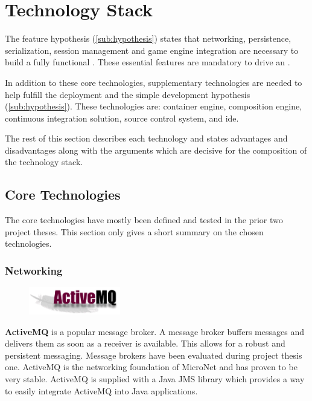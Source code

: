 \section{Technology Stack}

The feature hypothesis (\autoref{sub:hypothesis}) states that networking,
persistence, serialization, session management and game engine integration are
necessary to build a fully functional \og{}. These essential features are
mandatory to drive an \og{}.

In addition to these core technologies, supplementary technologies are needed to
help fulfill the deployment and the simple development hypothesis
(\autoref{sub:hypothesis}). These technologies are: container engine,
composition engine, continuous integration solution, source control system, and
\gls{ide}.

The rest of this section describes each technology and states advantages and
disadvantages along with the arguments which are decisive for the composition
of the technology stack.

\subsection{Core Technologies}

The core technologies have mostly been defined and tested in the prior two
project theses. This section only gives a short summary on the chosen
technologies.

\subsubsection{Networking}

\begin{figure}
	\vspace*{-0.2cm}
    \includegraphics[width=4cm]{images/dependencies/activemq}
\end{figure}

\textbf{ActiveMQ} is a popular message broker. A message broker buffers
messages and delivers them as soon as a receiver is available. This allows for a
robust and persistent messaging. Message brokers have been evaluated during
project thesis one. ActiveMQ is the networking foundation of MicroNet and
has proven to be very stable. ActiveMQ is supplied with a Java JMS library which
provides a way to easily integrate ActiveMQ into Java applications.

